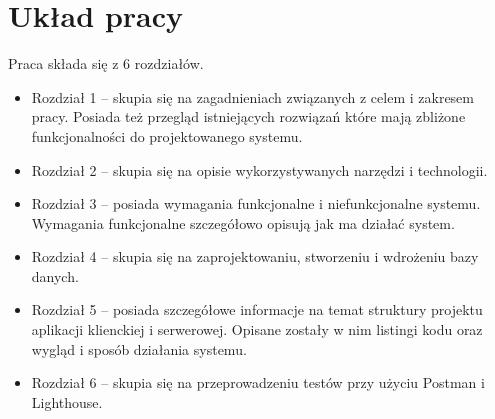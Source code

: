 \section{Układ pracy}
Praca składa się z 6 rozdziałów.
\begin {itemize}
	\item Rozdział 1 -- skupia się na zagadnieniach związanych z celem i zakresem pracy. Posiada też przegląd istniejących rozwiązań które mają zbliżone funkcjonalności do projektowanego systemu.
	\item Rozdział 2 -- skupia się na opisie wykorzystywanych narzędzi i technologii.
	\item Rozdział 3 -- posiada wymagania funkcjonalne i niefunkcjonalne systemu. Wymagania funkcjonalne szczegółowo opisują jak ma działać system.
	\item Rozdział 4 -- skupia się na zaprojektowaniu, stworzeniu i wdrożeniu bazy danych.
	\item Rozdział 5 -- posiada szczegółowe informacje na temat struktury projektu aplikacji klienckiej i serwerowej. Opisane zostały w nim listingi kodu oraz wygląd i sposób działania systemu.
	\item Rozdział 6 -- skupia się na przeprowadzeniu testów przy użyciu Postman i Lighthouse.
\end{itemize}


